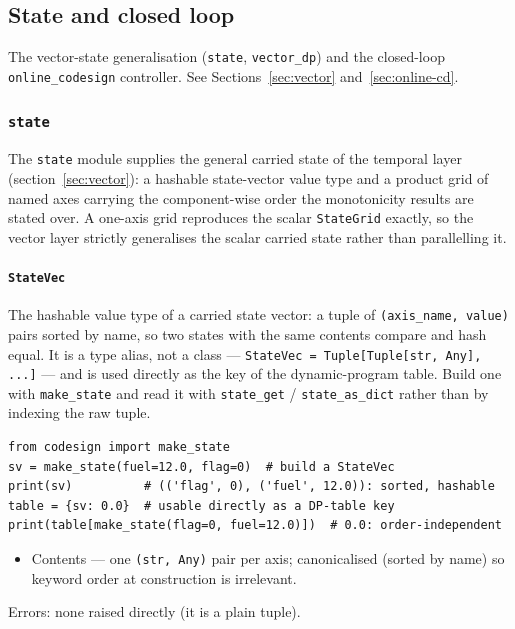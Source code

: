 \documentclass[11pt,a4paper]{article}
\begin{document}
\subsection{State and closed loop}

The vector-state generalisation (\texttt{state}, \texttt{vector\_dp}) and
the closed-loop \texttt{online\_codesign} controller. See
Sections~\ref{sec:vector} and~\ref{sec:online-cd}.

\subsubsection{\texttt{state}}
\label{ref:state}

The \texttt{state} module supplies the general carried state of the temporal
layer (section~\ref{sec:vector}): a hashable state-vector value type and a
product grid of named axes carrying the component-wise order the
monotonicity results are stated over. A one-axis grid reproduces the scalar
\texttt{StateGrid} exactly, so the vector layer strictly generalises the
scalar carried state rather than parallelling it.

\paragraph{\texttt{StateVec}}\label{ref:state:statevec}
The hashable value type of a carried state vector: a tuple of
\texttt{(axis\_name, value)} pairs sorted by name, so two states with the
same contents compare and hash equal. It is a type alias, not a class ---
\texttt{StateVec = Tuple[Tuple[str, Any], ...]} --- and is used directly as
the key of the dynamic-program table. Build one with \texttt{make\_state}
and read it with \texttt{state\_get} / \texttt{state\_as\_dict} rather than
by indexing the raw tuple.

\begin{lstlisting}
from codesign import make_state
sv = make_state(fuel=12.0, flag=0)  # build a StateVec
print(sv)          # (('flag', 0), ('fuel', 12.0)): sorted, hashable
table = {sv: 0.0}  # usable directly as a DP-table key
print(table[make_state(flag=0, fuel=12.0)])  # 0.0: order-independent
\end{lstlisting}

\begin{itemize}[nosep]
  \item Contents --- one \texttt{(str, Any)} pair per axis; canonicalised
    (sorted by name) so keyword order at construction is irrelevant.
\end{itemize}
Errors: none raised directly (it is a plain tuple).
\end{document}
